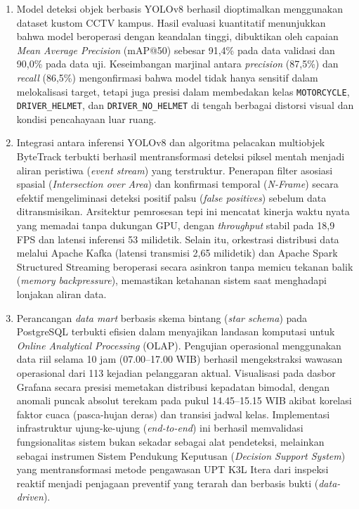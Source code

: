 \begin{enumerate}[1.]
  \item  Model deteksi objek berbasis YOLOv8 berhasil dioptimalkan menggunakan dataset kustom CCTV kampus. Hasil evaluasi kuantitatif menunjukkan bahwa model beroperasi dengan keandalan tinggi, dibuktikan oleh capaian \textit{Mean Average Precision} (mAP@50) sebesar 91,4\% pada data validasi dan 90,0\% pada data uji. Keseimbangan marjinal antara \textit{precision} (87,5\%) dan \textit{recall} (86,5\%) mengonfirmasi bahwa model tidak hanya sensitif dalam melokalisasi target, tetapi juga presisi dalam membedakan kelas \texttt{MOTORCYCLE}, \texttt{DRIVER\_HELMET}, dan \texttt{DRIVER\_NO\_HELMET} di tengah berbagai distorsi visual dan kondisi pencahayaan luar ruang.

  \item Integrasi antara inferensi YOLOv8 dan algoritma pelacakan multiobjek ByteTrack terbukti berhasil mentransformasi deteksi piksel mentah menjadi aliran peristiwa (\textit{event stream}) yang terstruktur. Penerapan filter asosiasi spasial (\textit{Intersection over Area}) dan konfirmasi temporal (\textit{N-Frame}) secara efektif mengeliminasi deteksi positif palsu (\textit{false positives}) sebelum data ditransmisikan. Arsitektur pemrosesan tepi ini mencatat kinerja waktu nyata yang memadai tanpa dukungan GPU, dengan \textit{throughput} stabil pada 18,9 FPS dan latensi inferensi 53 milidetik. Selain itu, orkestrasi distribusi data melalui Apache Kafka (latensi transmisi 2,65 milidetik) dan Apache Spark Structured Streaming beroperasi secara asinkron tanpa memicu tekanan balik (\textit{memory backpressure}), memastikan ketahanan sistem saat menghadapi lonjakan aliran data.

  \item Perancangan \textit{data mart} berbasis skema bintang (\textit{star schema}) pada PostgreSQL terbukti efisien dalam menyajikan landasan komputasi untuk \textit{Online Analytical Processing} (OLAP). Pengujian operasional menggunakan data riil selama 10 jam (07.00--17.00 WIB) berhasil mengekstraksi wawasan operasional dari 113 kejadian pelanggaran aktual. Visualisasi pada dasbor Grafana secara presisi memetakan distribusi kepadatan bimodal, dengan anomali puncak absolut terekam pada pukul 14.45--15.15 WIB akibat korelasi faktor cuaca (pasca-hujan deras) dan transisi jadwal kelas. Implementasi infrastruktur ujung-ke-ujung (\textit{end-to-end}) ini berhasil memvalidasi fungsionalitas sistem bukan sekadar sebagai alat pendeteksi, melainkan sebagai instrumen Sistem Pendukung Keputusan (\textit{Decision Support System}) yang mentransformasi metode pengawasan UPT K3L Itera dari inspeksi reaktif menjadi penjagaan preventif yang terarah dan berbasis bukti (\textit{data-driven}).
\end{enumerate}

